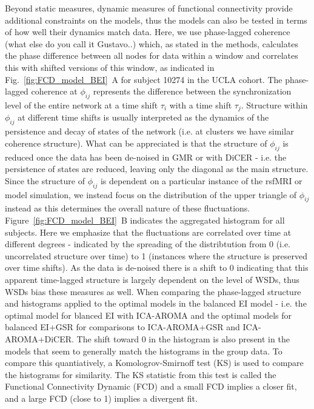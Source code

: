 \documentclass[oneside]{zHenriquesLab-StyleBioRxiv}
\begin{document}
Beyond static measures, dynamic measures of functional connectivity provide additional constraints on the models, thus the models can also be tested in terms of how well their dynamics match data. Here, we use phase-lagged coherence (what else do you call it Gustavo..) which, as stated in the methods, calculates the phase difference between all nodes for data within a window and correlates this with shifted versions of this window, as indicated in Fig.~\ref{fig:FCD_model_BEI}~A for subject 10274 in the UCLA cohort. The phase-lagged coherence at $\phi_{ij}$ represents the difference between the synchronization level of the entire network at a time shift $\tau_i$ with a time shift $\tau_j$. Structure within $\phi_{ij}$ at different time shifts is usually interpreted as the dynamics of the persistence and decay of states of the network (i.e. at clusters we have similar coherence structure). What can be appreciated is that the structure of $\phi_{ij}$ is reduced once the data has been de-noised in GMR or with DiCER - i.e. the persistence of states are reduced, leaving only the diagonal as the main structure. Since the structure of $\phi_{ij}$ is dependent on a particular instance of the rsfMRI or model simulation, we instead focus on the distribution of the upper triangle of $\phi_{ij}$ instead as this determines the overall nature of these fluctuations. Figure~\ref{fig:FCD_model_BEI}~B indicates the aggregated histogram for all subjects. Here we emphasize that the fluctuations are correlated over time at different degrees - indicated by the spreading of the distribtution from 0 (i.e. uncorrelated structure over time) to 1 (instances where the structure is preserved over time shifts). As the data is de-noised there is a shift to 0 indicating that this apparent time-lagged structure is largely dependent on the level of WSDs, thus WSDs bias these measures as well. When comparing the phase-lagged structure and histograms applied to the optimal models in the balanced EI model - i.e. the optimal model for blanced EI with ICA-AROMA and the optimal models for balanced EI+GSR for comparisons to ICA-AROMA+GSR and ICA-AROMA+DiCER. The shift toward 0 in the histogram is also present in the models that seem to generally match the histograms in the group data. To compare this quantiatively, a Komologrov-Smirnoff test (KS) is used to compare the histograms for similarity. The KS statistic from this test is called the Functional Connectivity Dynamic (FCD) and a small FCD implies a closer fit, and a large FCD (close to 1) implies a divergent fit. 
\end{document}

